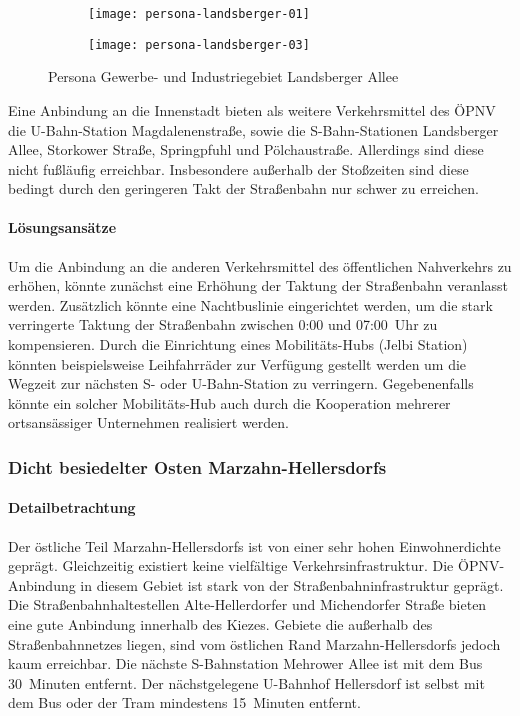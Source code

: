 \begin{figure}
    \centering
    \begin{subfigure}{.5\textwidth}
        \centering
        \texttt{[image: persona-landsberger-01]}
    \end{subfigure}%
    \begin{subfigure}{.5\textwidth}
        \centering
        \texttt{[image: persona-landsberger-03]}
    \end{subfigure}
    \caption{Persona Gewerbe- und Industriegebiet Landsberger Allee}
    \label{persona-landsberger-allee}
\end{figure}

Eine Anbindung an die Innenstadt bieten als weitere Verkehrsmittel des ÖPNV die U-Bahn-Station Magdalenenstraße, sowie die S-Bahn-Stationen Landsberger Allee, Storkower Straße, Springpfuhl und Pölchaustraße. Allerdings sind diese nicht fußläufig erreichbar. Insbesondere außerhalb der Stoßzeiten sind diese bedingt durch den geringeren Takt der Straßenbahn nur schwer zu erreichen.

\paragraph{Lösungsansätze}

Um die Anbindung an die anderen Verkehrsmittel des öffentlichen Nahverkehrs zu erhöhen, könnte zunächst eine Erhöhung der Taktung der Straßenbahn veranlasst werden. Zusätzlich könnte eine Nachtbuslinie eingerichtet werden, um die stark verringerte Taktung der Straßenbahn zwischen 0:00 und 07:00~Uhr zu kompensieren. Durch die Einrichtung eines Mobilitäts-Hubs (Jelbi Station) könnten beispielsweise Leihfahrräder zur Verfügung gestellt werden um die Wegzeit zur nächsten S- oder U-Bahn-Station zu verringern. Gegebenenfalls könnte ein solcher Mobilitäts-Hub auch durch die Kooperation mehrerer ortsansässiger Unternehmen realisiert werden.

\subsubsection{Dicht besiedelter Osten Marzahn-Hellersdorfs}

\paragraph{Detailbetrachtung}

Der östliche Teil Marzahn-Hellersdorfs ist von einer sehr hohen Einwohnerdichte geprägt. Gleichzeitig existiert keine vielfältige Verkehrsinfrastruktur. Die ÖPNV-Anbindung in diesem Gebiet ist stark von der Straßenbahninfrastruktur geprägt. Die Straßenbahnhaltestellen Alte-Hellerdorfer und Michendorfer Straße bieten eine gute Anbindung innerhalb des Kiezes. Gebiete die außerhalb des Straßenbahnnetzes liegen, sind vom östlichen Rand Marzahn-Hellersdorfs jedoch kaum erreichbar. Die nächste S-Bahnstation Mehrower Allee ist mit dem Bus 30~Minuten entfernt. Der nächstgelegene U-Bahnhof Hellersdorf ist selbst mit dem Bus oder der Tram mindestens 15~Minuten entfernt.

